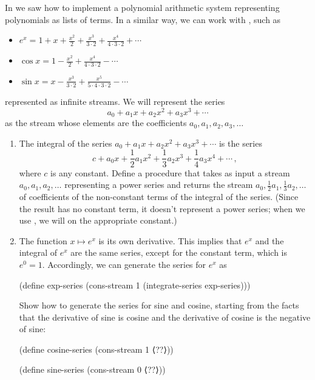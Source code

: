 \begin{exercise}
	\label{Exercise 3.59}
	In  we saw how to implement a polynomial arithmetic system representing polynomials as lists of terms.
	In a similar way, we can work with , such as
	\begin{itemize}

		\item
			$e^x = 1 + x + \frac{x^2}{2} + \frac{x^3}{3 ⋅ 2} + \frac{x^4}{4 ⋅ 3 ⋅ 2} + \dotsb$

		\item
			$\cos x = 1 - \frac{x^2}{2} + \frac{x^4}{4 ⋅ 3 ⋅ 2} - \dotsb$

		\item
			$\sin x = x - \frac{x^3}{3 ⋅ 2} + \frac{x^5}{5 ⋅ 4 ⋅ 3 ⋅ 2} - \dotsb$

	\end{itemize}
	represented as infinite streams.
	We will represent the series
	\[
		a_0 + a_1 x + a_2 x^2 + a_3 x^3 + \dotsb
	\]
	as the stream whose elements are the coefficients \( a_0, a_1, a_2, a_3, \dotsc \)
	\begin{enumerate}[label=\alph*., leftmargin=*]

		\item
			The integral of the series \( a_0 + a_1 x + a_2 x^2 + a_3 x^3 + \dotsb \) is the series
			\[
				c
				+ a_0 x
				+ \frac{1}{2} a_1 x^2
				+ \frac{1}{3} a_2 x^3
				+ \frac{1}{4} a_3 x^4
				+ \dotsb \,,
			\]
			where \( c \) is any constant.
			Define a procedure  that takes as input a stream \( a_0, a_1, a_2, \dotsc \) representing a power series and returns the stream \( a_0, \frac{1}{2} a_1, \frac{1}{3} a_2, \dotsc \) of coefficients of the non-constant terms of the integral of the series.
			(Since the result has no constant term, it doesn’t represent a power series;
			when we use , we will  on the appropriate constant.)

			\item
				The function \( x \mapsto e^x \) is its own derivative.
				This implies that \( e^x \) and the integral of \( e^x \) are the same series, except for the constant term, which is \( e^0 = 1 \).
				Accordingly, we can generate the series for \( e^x \) as
				\begin{scheme}
				  (define exp-series
				    (cons-stream 1 (integrate-series exp-series)))
				\end{scheme}

				Show how to generate the series for sine and cosine, starting from the facts that the derivative of sine is cosine and the derivative of cosine is the negative of sine:
				\begin{scheme}
				  (define cosine-series (cons-stream 1 ⟨??⟩))

				  (define sine-series (cons-stream 0 ⟨??⟩))
				\end{scheme}

		\end{enumerate}
\end{exercise}



